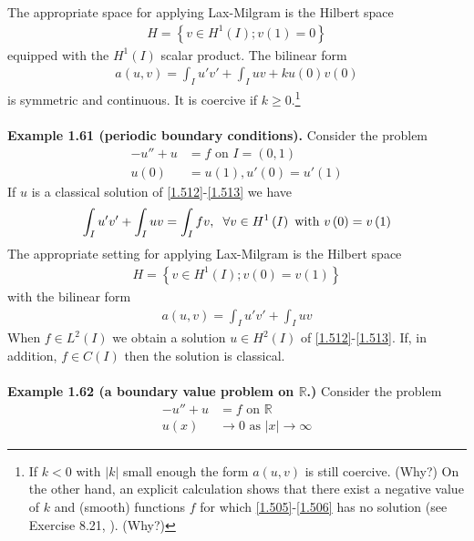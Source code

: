 \documentclass[a4paper,oneside]{book}
\numberwithin{equation}{chapter}
\begin{document}
The appropriate space for applying Lax-Milgram is the Hilbert space
\begin{align}
H = \left\{ {v \in {H^1}\left( I \right);v\left( 1 \right) = 0} \right\}
\end{align}
equipped with the $H^1\left(I\right)$ scalar product. The bilinear form
\begin{align}
a\left( {u,v} \right) = \int_I {u'v'}  + \int_I {uv}  + ku\left( 0 \right)v\left( 0 \right)
\end{align}
is symmetric and continuous. It is coercive if $k\ge 0$.\footnote{If $k<0$ with $\left| k \right|$ small enough the form $a\left(u,v\right)$ is still coercive. (Why?) On the other hand, an explicit calculation shows that there exist a negative value of $k$ and (smooth) functions $f$ for which \eqref{1.505}-\eqref{1.506} has no solution (see Exercise 8.21, \cite{1}). (Why?)}\\
\\
\textbf{Example 1.61 (periodic boundary conditions).} Consider the problem
\begin{align}
\label{1.512}
 - u'' + u &= f\mbox{ on } I = \left( {0,1} \right)\\
u\left( 0 \right) &= u\left( 1 \right),u'\left( 0 \right) = u'\left( 1 \right) \label{1.513}
\end{align}
If $u$ is a classical solution of \eqref{1.512}-\eqref{1.513} we have
\begin{align}
\int_I {u'v'}  + \int_I {uv}  = \int_I {fv} ,\hspace{0.2cm}\forall v \in {H^1}\left( I \right)\mbox{ with } v\left( 0 \right) = v\left( 1 \right)
\end{align}
The appropriate setting for applying Lax-Milgram is the Hilbert space
\begin{align}
H = \left\{ {v \in {H^1}\left( I \right);v\left( 0 \right) = v\left( 1 \right)} \right\}
\end{align}
with the bilinear form
\begin{align}
a\left( {u,v} \right) = \int_I {u'v'}  + \int_I {uv} 
\end{align}
When $f\in L^2\left(I\right)$ we obtain a solution $u\in H^2\left(I\right)$ of \eqref{1.512}-\eqref{1.513}. If, in addition, $f\in C\left(I\right)$ then the solution is classical.\\
\\
\textbf{Example 1.62 (a boundary value problem on $\mathbb{R}$.)} Consider the problem
\begin{align}
\label{1.517}
 - u'' + u &= f\mbox{ on } \mathbb{R}\\
u\left( x \right) &\to 0\mbox{ as } \left| x \right| \to \infty \label{1.518}
\end{align}
\end{document}

